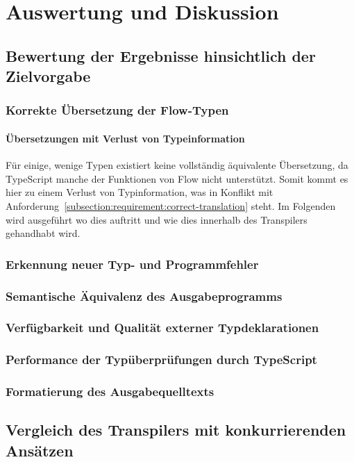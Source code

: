 \chapter{Auswertung und Diskussion}
\label{chap:evaluation}


\section{Bewertung der Ergebnisse hinsichtlich der Zielvorgabe}

\subsection{Korrekte Übersetzung der Flow-Typen}

\subsubsection{Übersetzungen mit Verlust von Typeinformation}

Für einige, wenige Typen existiert keine vollständig äquivalente Übersetzung, da TypeScript manche der Funktionen von Flow nicht unterstützt. Somit kommt es hier zu einem Verlust von Typinformation, was in Konflikt mit Anforderung~\ref{subsection:requirement:correct-translation} steht. Im Folgenden wird ausgeführt wo dies auftritt und wie dies innerhalb des Transpilers gehandhabt wird.

\subsection{Erkennung neuer Typ- und Programmfehler}

\subsection{Semantische Äquivalenz des Ausgabeprogramms}

\subsection{Verfügbarkeit und Qualität externer Typdeklarationen}

\subsection{Performance der Typüberprüfungen durch TypeScript}

\subsection{Formatierung des Ausgabequelltexts}

\section{Vergleich des Transpilers mit konkurrierenden Ansätzen}
\label{evaluation:other-tools}
